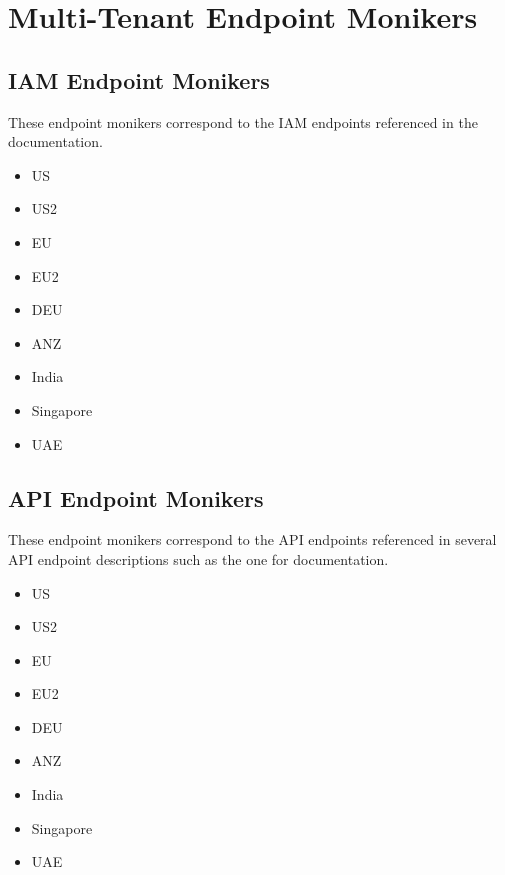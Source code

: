 \chapter{\cxonetext\space Multi-Tenant Endpoint Monikers}
\label{sec:endpoint-monikers}


\section{IAM Endpoint Monikers}

These endpoint monikers correspond to the IAM endpoints referenced in the 
 documentation.

\begin{itemize}
    \item US
    \item US2
    \item EU
    \item EU2
    \item DEU
    \item ANZ
    \item India
    \item Singapore
    \item UAE
\end{itemize}


\section{API Endpoint Monikers}

These endpoint monikers correspond to the API endpoints referenced in several
API endpoint descriptions such as the one for 
 documentation.




\begin{itemize}
    \item US
    \item US2
    \item EU
    \item EU2
    \item DEU
    \item ANZ
    \item India
    \item Singapore
    \item UAE
\end{itemize}
